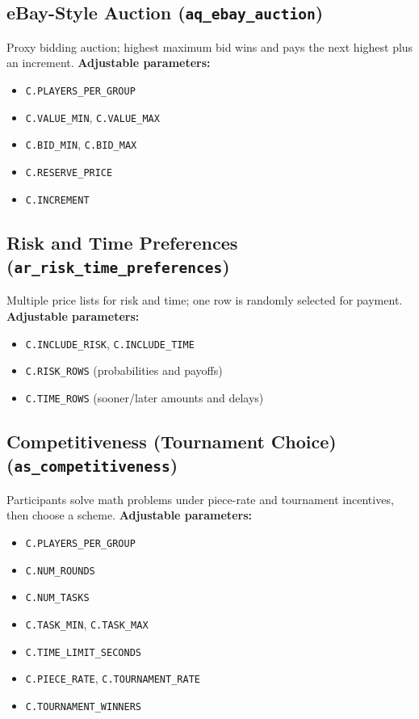 \documentclass[11pt]{article}
\begin{document}
\subsection*{eBay-Style Auction (\texttt{aq\_ebay\_auction})}
Proxy bidding auction; highest maximum bid wins and pays the next highest plus an increment.
\textbf{Adjustable parameters:}
\begin{itemize}
\item \texttt{C.PLAYERS\_PER\_GROUP}
\item \texttt{C.VALUE\_MIN}, \texttt{C.VALUE\_MAX}
\item \texttt{C.BID\_MIN}, \texttt{C.BID\_MAX}
\item \texttt{C.RESERVE\_PRICE}
\item \texttt{C.INCREMENT}
\end{itemize}

\subsection*{Risk and Time Preferences (\texttt{ar\_risk\_time\_preferences})}
Multiple price lists for risk and time; one row is randomly selected for payment.
\textbf{Adjustable parameters:}
\begin{itemize}
\item \texttt{C.INCLUDE\_RISK}, \texttt{C.INCLUDE\_TIME}
\item \texttt{C.RISK\_ROWS} (probabilities and payoffs)
\item \texttt{C.TIME\_ROWS} (sooner/later amounts and delays)
\end{itemize}

\subsection*{Competitiveness (Tournament Choice) (\texttt{as\_competitiveness})}
Participants solve math problems under piece-rate and tournament incentives, then choose a scheme.
\textbf{Adjustable parameters:}
\begin{itemize}
\item \texttt{C.PLAYERS\_PER\_GROUP}
\item \texttt{C.NUM\_ROUNDS}
\item \texttt{C.NUM\_TASKS}
\item \texttt{C.TASK\_MIN}, \texttt{C.TASK\_MAX}
\item \texttt{C.TIME\_LIMIT\_SECONDS}
\item \texttt{C.PIECE\_RATE}, \texttt{C.TOURNAMENT\_RATE}
\item \texttt{C.TOURNAMENT\_WINNERS}
\end{itemize}
\end{document}
